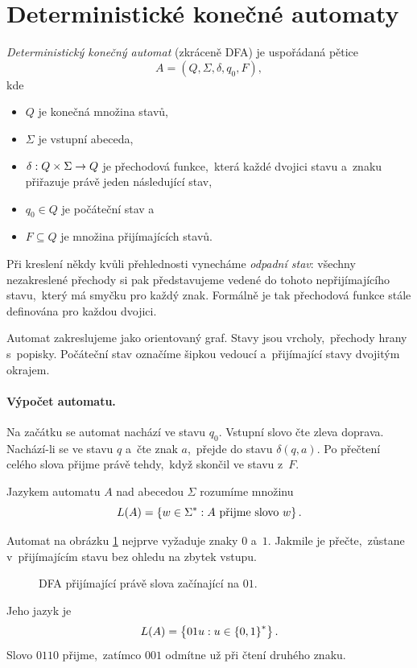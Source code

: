 \section{Deterministické konečné automaty}\label{sec:det-automaty}

\begin{definition}
    \emph{Deterministický konečný automat} (zkráceně DFA) je uspořádaná pětice
    \[A=(Q,\Sigma,\delta,q_0,F),\]
    kde
    \begin{itemize}
        \item $Q$ je konečná množina stavů,
        \item $\Sigma$ je vstupní abeceda,
        \item $\delta:Q\times\Sigma \rightarrow Q$ je přechodová funkce,~která každé dvojici stavu a~znaku přiřazuje právě jeden následující stav,
        \item $q_0\in Q$ je počáteční stav a
        \item $F\subseteq Q$ je množina přijímajících stavů.
    \end{itemize}
\end{definition}

Při kreslení někdy kvůli přehlednosti vynecháme \emph{odpadní stav}: všechny nezakreslené přechody si pak představujeme vedené do tohoto nepřijímajícího stavu,~který má smyčku pro každý znak. Formálně je tak přechodová funkce stále definována pro každou dvojici.

Automat zakreslujeme jako orientovaný graf. Stavy jsou vrcholy,~přechody hrany s~popisky. Počáteční stav označíme šipkou vedoucí  a~přijímající stavy dvojitým okrajem.

\paragraph{Výpočet automatu.}

Na začátku se automat nachází ve stavu $q_0$. Vstupní slovo čte zleva doprava. Nachází-li se ve stavu $q$ a~čte znak $a$,~přejde do stavu $\delta(q,a)$. Po přečtení celého slova přijme právě tehdy,~když skončil ve stavu z~$F$.

\begin{definition}
    Jazykem automatu $A$ nad abecedou $\Sigma$ rozumíme množinu
    \[L(A)=\left\{w\in\Sigma^*:\text{$A$ přijme slovo $w$}\right\}.\]
\end{definition}

\begin{example}\label{ex:dfa-prefix}
    Automat na obrázku \ref{fig:dfa-prefix} nejprve vyžaduje znaky $0$ a~$1$. Jakmile je přečte,~zůstane v~přijímajícím stavu bez ohledu na zbytek vstupu.
    \begin{figure}[h]
        \centering
        
        \caption{DFA přijímající právě slova začínající na $01$.}
        \label{fig:dfa-prefix}
    \end{figure}
    Jeho jazyk je
    \[L(A)=\left\{01u:u\in\left\{0,1\right\}^*\right\}.\]
    Slovo $0110$ přijme,~zatímco $001$ odmítne už při čtení druhého znaku.
\end{example}

